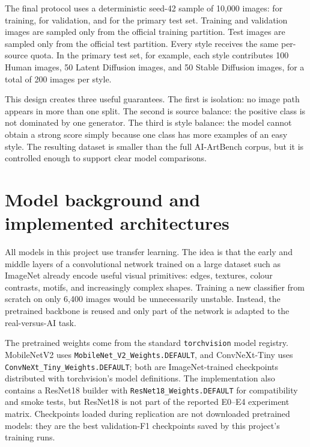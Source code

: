 \documentclass[11pt,a4paper]{article}
\begin{document}
The final protocol uses a deterministic seed-42 sample of 10,000 images:
\TrainCount{} for training, \ValidationCount{} for validation, and \TestCount{}
for the primary test set. Training and validation images are sampled only from
the official training partition. Test images are sampled only from the official
test partition. Every style receives the same per-source quota. In the primary
test set, for example, each style contributes 100 Human images, 50 Latent
Diffusion images, and 50 Stable Diffusion images, for a total of 200 images per
style.

This design creates three useful guarantees. The first is isolation: no image
path appears in more than one split. The second is source balance: the positive
class is not dominated by one generator. The third is style balance: the model
cannot obtain a strong score simply because one class has more examples of an
easy style. The resulting dataset is smaller than the full AI-ArtBench corpus,
but it is controlled enough to support clear model comparisons.

\section{Model background and implemented architectures}

All models in this project use transfer learning. The idea is that the early
and middle layers of a convolutional network trained on a large dataset such as
ImageNet already encode useful visual primitives: edges, textures, colour
contrasts, motifs, and increasingly complex shapes. Training a new classifier
from scratch on only 6,400 images would be unnecessarily unstable. Instead,
the pretrained backbone is reused and only part of the network is adapted to
the real-versus-AI task.

The pretrained weights come from the standard \texttt{torchvision} model
registry. MobileNetV2 \cite{sandler2018mobilenetv2} uses
\texttt{MobileNet\_V2\_Weights.DEFAULT}, and ConvNeXt-Tiny
\cite{liu2022convnext} uses \texttt{ConvNeXt\_Tiny\_Weights.DEFAULT}; both are
ImageNet-trained checkpoints distributed with torchvision's model definitions.
The implementation also contains a ResNet18 builder with
\texttt{ResNet18\_Weights.DEFAULT} for compatibility and smoke tests, but
ResNet18 is not part of the reported E0--E4 experiment matrix. Checkpoints
loaded during replication are not downloaded pretrained models: they are the
best validation-F1 checkpoints saved by this project's training runs.
\end{document}
